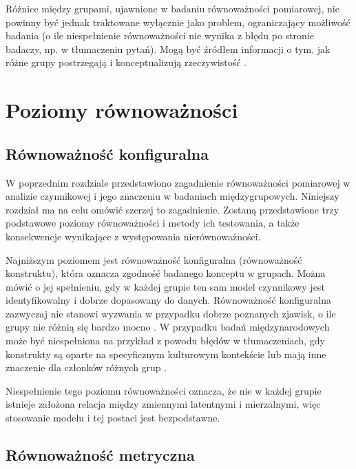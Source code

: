\documentclass[12pt]{article}
\begin{document}
Różnice między grupami, ujawnione w badaniu równoważności pomiarowej, nie powinny być jednak traktowane wyłącznie jako problem, ograniczający możliwość badania (o ile niespełnienie równoważności nie wynika z błędu po stronie badaczy, np. w tłumaczeniu pytań). Mogą być źródłem informacji o tym, jak różne grupy postrzegają i konceptualizują rzeczywistość \citep{CheungRens}.

\newpage

\hypertarget{poziomy-ruxf3wnowaux17cnoux15bci}{%
\section{Poziomy równoważności}\label{poziomy-ruxf3wnowaux17cnoux15bci}}

\hypertarget{ruxf3wnowaux17cnoux15bux107-konfiguralna}{%
\subsection{Równoważność konfiguralna}\label{ruxf3wnowaux17cnoux15bux107-konfiguralna}}

W poprzednim rozdziale przedstawiono zagadnienie równoważności pomiarowej w analizie czynnikowej i jego znaczeniu w badaniach międzygrupowych. Niniejszy rozdział ma na celu omówić szerzej to zagadnienie. Zostaną przedstawione trzy podstawowe poziomy równoważności i metody ich testowania, a także konsekwencje wynikające z występowania nierównoważności.

Najniższym poziomem jest równoważność konfiguralna (równoważność konstruktu), która oznacza zgodność badanego konceptu w grupach. Można mówić o jej spełnieniu, gdy w każdej grupie ten sam model czynnikowy jest identyfikowalny i dobrze dopasowany do danych. Równoważność konfiguralna zazwyczaj nie stanowi wyzwania w przypadku dobrze poznanych zjawisk, o ile grupy nie różnią się bardzo mocno \citep{LubGlog}. W przypadku badań międzynarodowych może być niespełniona na przykład z powodu błędów w tłumaczeniach, gdy konstrukty są oparte na specyficznym kulturowym kontekście lub mają inne znaczenie dla członków różnych grup \citep{CheungRens}.

Niespełnienie tego poziomu równoważności oznacza, że nie w każdej grupie istnieje założona relacja między zmiennymi latentnymi i mierzalnymi, więc stosowanie modelu i tej postaci jest bezpodstawne.

\hypertarget{ruxf3wnowaux17cnoux15bux107-metryczna}{%
\subsection{Równoważność metryczna}\label{ruxf3wnowaux17cnoux15bux107-metryczna}}
\end{document}
